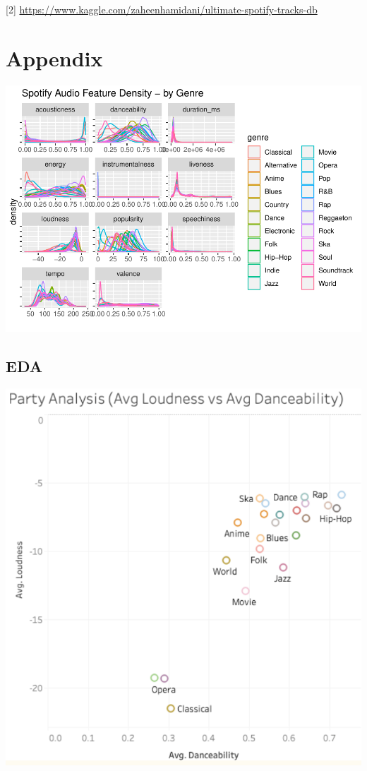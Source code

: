 \documentclass[
]{article}
\begin{document}
{[}2{]}
\url{https://www.kaggle.com/zaheenhamidani/ultimate-spotify-tracks-db}

\hypertarget{appendix}{%
\section{Appendix}\label{appendix}}

\includegraphics{write-up_files/figure-latex/unnamed-chunk-8-1.pdf}

\hypertarget{eda}{%
\subsection{EDA}\label{eda}}

\begin{center}\includegraphics[width=0.7\linewidth]{Screen Shot 2020-11-23 at 11.34.18 PM} \end{center}
\end{document}
